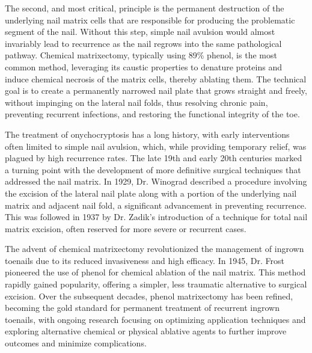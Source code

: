 The second, and most critical, principle is the permanent destruction of the underlying nail matrix cells that are responsible for producing the problematic segment of the nail. Without this step, simple nail avulsion would almost invariably lead to recurrence as the nail regrows into the same pathological pathway. Chemical matrixectomy, typically using 89\% phenol, is the most common method, leveraging its caustic properties to denature proteins and induce chemical necrosis of the matrix cells, thereby ablating them. The technical goal is to create a permanently narrowed nail plate that grows straight and freely, without impinging on the lateral nail folds, thus resolving chronic pain, preventing recurrent infections, and restoring the functional integrity of the toe.

The treatment of onychocryptosis has a long history, with early interventions often limited to simple nail avulsion, which, while providing temporary relief, was plagued by high recurrence rates. The late 19th and early 20th centuries marked a turning point with the development of more definitive surgical techniques that addressed the nail matrix. In 1929, Dr. Winograd described a procedure involving the excision of the lateral nail plate along with a portion of the underlying nail matrix and adjacent nail fold, a significant advancement in preventing recurrence. This was followed in 1937 by Dr. Zadik's introduction of a technique for total nail matrix excision, often reserved for more severe or recurrent cases.

The advent of chemical matrixectomy revolutionized the management of ingrown toenails due to its reduced invasiveness and high efficacy. In 1945, Dr. Frost pioneered the use of phenol for chemical ablation of the nail matrix. This method rapidly gained popularity, offering a simpler, less traumatic alternative to surgical excision. Over the subsequent decades, phenol matrixectomy has been refined, becoming the gold standard for permanent treatment of recurrent ingrown toenails, with ongoing research focusing on optimizing application techniques and exploring alternative chemical or physical ablative agents to further improve outcomes and minimize complications.

